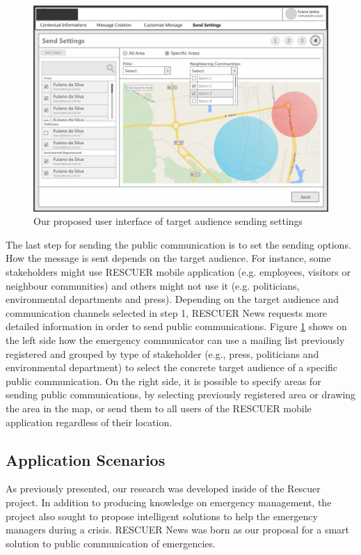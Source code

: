 \begin{figure}
\centering
\includegraphics[width=\linewidth]{images/step4.png}
\caption{Our proposed user interface of target audience sending settings}
\label{fig:step4}
\end{figure}

The last step for sending the public communication is to set the sending options. How the
message is sent depends on the target audience. For instance, some stakeholders might use
RESCUER mobile application (e.g. employees, visitors or neighbour communities) and others might
not use it (e.g. politicians, environmental departments and press). Depending on the target audience
and communication channels selected in step 1, RESCUER News requests more detailed information
in order to send public communications. Figure \ref{fig:step4} shows on the left side how the emergency
communicator can use a mailing list previously registered and grouped by type of stakeholder (e.g.,
press, politicians and environmental department) to select the concrete target audience of a specific
public communication. On the right side, it is possible to specify areas for sending public
communications, by selecting previously registered area or drawing the area in the map, or send
them to all users of the RESCUER mobile application regardless of their location.


\subsection{Application Scenarios}

As previously presented, our research was developed inside of the Rescuer project. In addition to producing knowledge on emergency management, the project also sought to propose intelligent solutions to help the emergency managers during a crisis. RESCUER News was born as our proposal for a smart solution to public communication of emergencies. 

